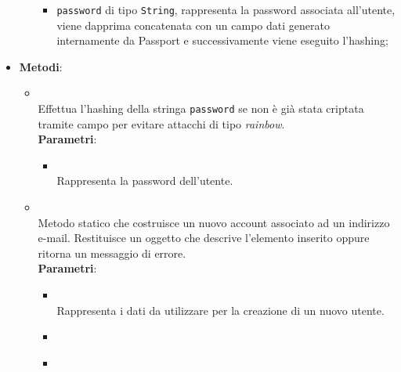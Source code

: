 \begin{itemize}
\begin{itemize}
\begin{itemize}
\item \texttt{password} di tipo \texttt{String}, rappresenta la password associata all'utente, viene dapprima concatenata con un campo dati  generato internamente da Passport e successivamente viene eseguito l'hashing;
\end{itemize}
\end{itemize}
\item \textbf{Metodi}:
\begin{itemize}
\item {}
\\ Effettua l'hashing della stringa \texttt{password} se non è già stata criptata tramite campo \texttt{} per evitare attacchi di tipo \textit{rainbow}.
\\ \textbf{Parametri}:
\begin{itemize}
\item {}
\\ Rappresenta la password dell'utente.
\end{itemize}
\item {}
\\ Metodo statico che costruisce un nuovo account associato ad un indirizzo e-mail.  Restituisce un oggetto  che descrive l’elemento inserito oppure ritorna un messaggio di errore.
\\ \textbf{Parametri}:
\begin{itemize}
\item {}
\\ Rappresenta i dati da utilizzare per la creazione di un nuovo utente.
\item {}
\\ \dpCallback
\item {}
\\ \dpErrBackConstructor
\end{itemize}
\end{itemize}
\end{itemize}
\subsection{}
\label{\nogloxy{Premi::Back-End::App::Routers}}
